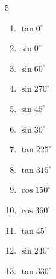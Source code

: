 \begin{multicols}{5}
\begin{enumerate}
  \item $\displaystyle \tan{0^\circ}$

        \phantom{$\displaystyle =0$}

  \item $\displaystyle \sin{0^\circ}$

        \phantom{$\displaystyle =0$}

  \item $\displaystyle \sin{60^\circ}$


  \item $\displaystyle \sin{270^\circ}$

        \phantom{$\displaystyle =-1$}

  \item $\displaystyle \sin{45^\circ}$


  \item $\displaystyle \sin{30^\circ}$


  \item $\displaystyle \tan{225^\circ}$

        \phantom{$\displaystyle =1$}

  \item $\displaystyle \tan{315^\circ}$

        \phantom{$\displaystyle =-1$}

  \item $\displaystyle \cos{150^\circ}$


  \item $\displaystyle \cos{360^\circ}$

        \phantom{$\displaystyle =1$}

  \item $\displaystyle \tan{45^\circ}$

        \phantom{$\displaystyle =1$}

  \item $\displaystyle \sin{240^\circ}$


  \item $\displaystyle \tan{330^\circ}$



\end{enumerate}
\end{multicols}
